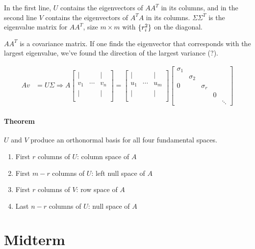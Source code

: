 In the first line, $U$ contains the eigenvectors of $AA^T$ in its columns, and in the second line $V$ contains the eigenvectors of $A^TA$ in its columns. $\Sigma \Sigma^T$ is the eigenvalue matrix for $AA^T$, size $m \times m$ with $\{r_i^2\}$ on the diagonal.

$A A^T$ is a covariance matrix. If one finds the eigenvector that corresponds with the largest eigenvalue, we've found the direction of the largest variance (?).

\begin{align*}
  A v &= U \Sigma \Rightarrow
  A
  \begin{bmatrix}
    | & & | \\
    v_1 & \cdots & v_n \\
    | & & | \\
  \end{bmatrix}
  =
  \begin{bmatrix}
    | & & | \\
    u_1 & \cdots & u_m \\
    | & & | \\
  \end{bmatrix}
  \begin{bmatrix}
    \sigma_1 \\
    &\sigma_2 \\
    0& &\sigma_r \\
    & & & 0 \\
    & & & & \ddots
  \end{bmatrix}
\end{align*}

\paragraph{Theorem} $U$ and $V$ produce an orthonormal basis for all four fundamental spaces.
\begin{enumerate}
  \item First $r$ columns of $U$: column space of $A$
  \item First $m-r$ columns of $U$: left null space of $A$
  \item First $r$ columns of $V$: row space of $A$
  \item Last $n-r$ columns of $U$: null space of $A$
\end{enumerate}

\section{Midterm}


